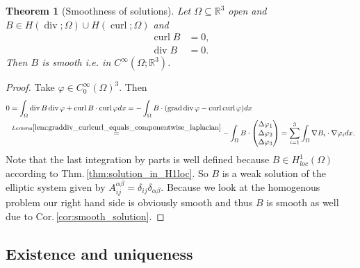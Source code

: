 \documentclass[12pt,a4paper]{article}
\numberwithin{equation}{subsection}
\numberwithin{lemma}{subsection}
\newtheorem{theorem}[lemma]{Theorem}
\theoremstyle{definition}
\newtheorem{remark}[lemma]{Remark}
\DeclareMathOperator{\curl}{curl}
\DeclareMathOperator{\diver}{div}
\DeclareMathOperator{\grad}{grad}
\newcommand{\real}{\mathbb{R}}
\begin{document}
\begin{theorem}[Smoothness of solutions]\label{thm:smoothness_of_solutions}
    Let $\Omega \subseteq \real^3$ open and 
    $B \in H(\diver;\Omega) \cup H(\curl;\Omega)$ and 
    \begin{align*}
        \curl B &= 0,
        \\ \diver B &= 0.
    \end{align*}
    Then $B$ is smooth i.e. in $C^\infty(\Omega;\real^3)$.
\end{theorem}
\begin{proof}
    Take $\varphi \in C_0^\infty(\Omega)^3$. Then 
    \begin{align*}
        0 &= \int_\Omega \diver B \diver \varphi + \curl B \cdot \curl \varphi dx
        = - \int_\Omega B \cdot (\grad \diver \varphi - \curl \curl \varphi) dx
        \\ &\stackrel{Lemma 
            \ref{lem:graddiv_curlcurl_equals_componentwise_laplacian}}{=} 
            - \int_\Omega B \cdot 
            \begin{pmatrix}
                \Delta \varphi_1 \\ \Delta \varphi_2 \\ \Delta \varphi_3
            \end{pmatrix}
        = \sum\limits_{i=1}^3 \int_\Omega \nabla B_i \cdot \nabla \varphi_i dx.
    \end{align*}
    Note that the last integration by parts is well defined because 
    $B \in H^1_{loc}(\Omega)$ according to Thm.\,\ref{thm:solution_in_H1loc}. 
    So $B$ is a weak solution 
    of the elliptic system given by 
    $A_{ij}^{\alpha \beta} = \delta_{ij} \delta_{\alpha\beta}$. Because 
    we look at the homogenous problem our right hand side is obviously smooth 
    and thus $B$ is smooth as well due to Cor.\,\ref{cor:smooth_solution}.
\end{proof}




\subsection{Existence and uniqueness}
\end{document}
